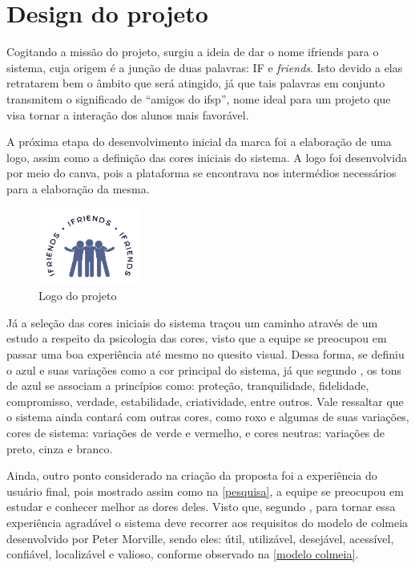 \section{Design do projeto}
Cogitando a missão do projeto, surgiu a ideia de dar o nome \gls{ifriends} para o sistema, cuja origem é a junção de duas palavras: IF e \textsl{friends}. Isto devido a elas retratarem bem o âmbito que será atingido, já que tais palavras em conjunto transmitem o significado de ``amigos do \acs{ifsp}'', nome ideal para um projeto que visa tornar a interação dos alunos mais favorável.

A próxima etapa do desenvolvimento inicial da marca foi a elaboração de uma logo, assim como a definição das cores iniciais do sistema. A logo foi desenvolvida por meio do \gls{canva}, pois a plataforma se encontrava nos intermédios necessários para a elaboração da mesma. 

\begin{figure}[htb]
\centering
\caption{Logo do projeto}
\includegraphics[width=0.3\textwidth]{anexos/Imagens_Proposta/logo.png}
\end{figure}
\FloatBarrier

Já a seleção das cores iniciais do sistema traçou um caminho através de um estudo a respeito da psicologia das cores, visto que a equipe se preocupou em passar uma boa experiência até mesmo no quesito visual. Dessa forma, se definiu o azul e suas variações como a cor principal do sistema, já que segundo , os tons de azul se associam a princípios como: proteção, tranquilidade, fidelidade, compromisso, verdade, estabilidade, criatividade, entre outros. Vale ressaltar que o sistema ainda contará com outras cores, como roxo e algumas de suas variações, cores de sistema: variações de verde e vermelho, e cores neutras: variações de preto, cinza e branco.

Ainda, outro ponto considerado na criação da proposta foi a experiência do usuário final, pois mostrado assim como na \autoref{pesquisa}, a equipe se preocupou em estudar e conhecer melhor as dores deles. Visto que, segundo , para tornar essa experiência agradável o sistema deve recorrer aos requisitos do modelo de colmeia desenvolvido por Peter Morville, sendo eles: útil, utilizável, desejável, acessível, confiável, localizável e valioso, conforme observado na \autoref{modelo colmeia}.

